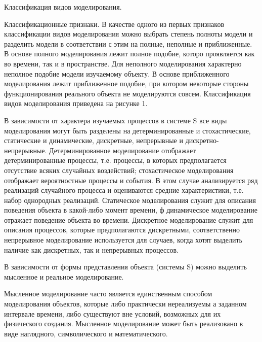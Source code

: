 \documentclass{article}
\begin{document}

    Классификация видов моделирования.

    Классификационные признаки. В качестве одного из первых признаков классификации видов моделирования можно выбрать степень полноты модели и разделить модели в соответствии с этим на полные, неполные и приближенные. В основе полного моделирования лежит полное подобие, которо проявляется как во времени, так и в пространстве. Для неполного моделирования характерно неполное подобие модели изучаемому объекту. В основе приближенного моделирования лежит приближенное подобие, при котором некоторые стороны функционирования реального объекта не моделируются совсем. Классификация видов моделирования приведена на рисунке 1.

    В зависимости от характера изучаемых процессов в системе S все виды моделирования могут быть разделены на детерминированные и стохастические, статические и динамические, дискретные, непрерывные и дискретно-непрерывные. Детерминированное моделирование отображает детерминированные процессы, т.е. процессы, в которых предполагается отсутствие всяких случайных воздействий; стохастическое моделирования отображает вероятностные процессы и события. В этом случае анализируется ряд реализаций случайного процесса и оцениваются средние характеристики, т.е. набор однородных реализаций. Статическое моделирования служит для описания поведения объекта в какой-либо момент времени, ф динамическое моделирование отражает поведение объекта во времени. Дискретное моделирование служит для описания процессов, которые предполагаются дискретными, соответственно непрерывное моделирование используется для случаев, когда хотят выделить наличие как дискретных, так и непрерывных процессов.

    В зависимости от формы представления объекта (системы S) можно выделить мысленное и реальное моделирование.

    Мысленное моделирование часто является единственным способом моделирования объектов, которые либо практически нереализуемы а заданном интервале времени, либо существуют вне условий, возможных для их физического создания. Мысленное моделирование может быть реализовано в виде наглядного, символического и математического.
\end{document}
